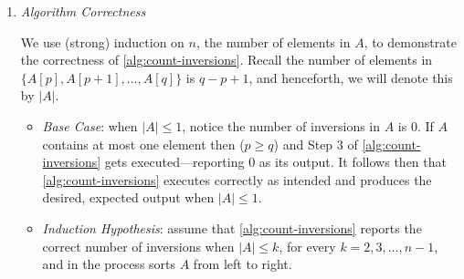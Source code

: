 \documentclass{article}
\begin{document}
\begin{enumerate}[leftmargin={*}, font={\bf}, label={\arabic*.}, ref={\arabic*}]
\begin{enumerate}
\begin{enumerate}[leftmargin={*}, label={\arabic*.}]
          \item
            {\it Algorithm Correctness}

            We use (strong) induction on $n$, the number of elements in $A$, to demonstrate the
            correctness of \autoref{alg:count-inversions}. Recall the number of elements in $\{A[p],
            A[p+1], \ldots, A[q]\}$ is $q - p + 1$, and henceforth, we will denote this by $|A|$.

            \begin{itemize}[itemsep=0pt]
              \item
                {\it Base Case}: when $|A| \leq 1$, notice the number of inversions in $A$ is $0$.
                If $A$ contains at most one element then ($p \geq q$) and Step $3$ of
                \autoref{alg:count-inversions} gets executed---reporting $0$ as its output. It
                follows then that \autoref{alg:count-inversions} executes correctly as intended
                and produces the desired, expected output when $|A| \leq 1$.
              \item
                {\it Induction Hypothesis}: assume that \autoref{alg:count-inversions} reports the
                correct number of inversions when $|A| \leq k$, for every $k = 2, 3, \ldots, n-1$,
                and in the process sorts $A$ from left to right.


\end{itemize}
\end{enumerate}
\end{enumerate}
\end{enumerate}
\end{document}
